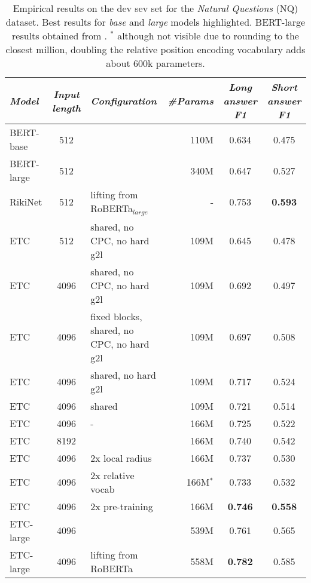 \documentclass[11pt,a4paper]{article}
\begin{document}
\begin{table*}[tb]\centering 


\begin{small}
\begin{tabular}{lclr|cc} 
{\em Model} & {\em Input length} & {\em Configuration} & {\em \#Params} & {\em Long answer F1} & {\em Short answer F1}  \\ \hline
BERT-base    &   512     &  & 110M                   & 0.634     & 0.475 \\
BERT-large    &   512     & & 340M                     & 0.647     & 0.527 \\
RikiNet & 512       & lifting from RoBERTa$_{\mathit{large}}$ & - &  0.753 & {\bf 0.593} \\ 
\hline
ETC	    &   512	    & shared, no CPC, no hard g2l                   & 109M  & 0.645     & 0.478 \\
ETC	    &   4096	    & shared, no CPC, no hard g2l               & 109M      & 0.692	& 0.497 \\
ETC	    &   4096	    & fixed blocks, shared, no CPC, no hard g2l               & 109M      & 0.697	     & 0.508 \\
ETC	    &   4096	    & shared, no hard g2l                 & 109M    & 0.717	     & 0.524 \\
ETC	    &   4096	    & shared                & 109M     & 0.721		     & 0.514 \\
ETC	    &   4096    & -                & 166M     & 0.725		    & 0.522 \\ \hline
ETC	    &   8192    &                  & 166M    & 0.740	    & 0.542 \\
ETC	    &   4096	& 2x local radius    & 166M & 0.737		    & 0.530 \\ 
ETC	    &   4096	& 2x relative vocab   & 166M$^*$  & 0.733	    & 0.532 \\ 
ETC	    &   4096	& 2x pre-training     & 166M  & {\bf 0.746}	    & {\bf 0.558} \\ \hline
ETC-large	&   4096	&                & 539M  & 0.761	     & 0.565 \\
ETC-large   &   4096    & lifting from RoBERTa  & 558M & {\bf 0.782}	& 0.585 \\
\end{tabular}	
\end{small}
\caption{Empirical results on the dev sev set for the {\em Natural Questions} (NQ) dataset. Best results for {\em base} and {\em large} models highlighted. BERT-large results obtained from \citet{alberti2019bert}. $^*$ although not visible due to rounding to the closest million, doubling the relative position encoding vocabulary adds about 600k parameters.}
\label{tbl:results-nq} 
\end{table*}
\end{document}
